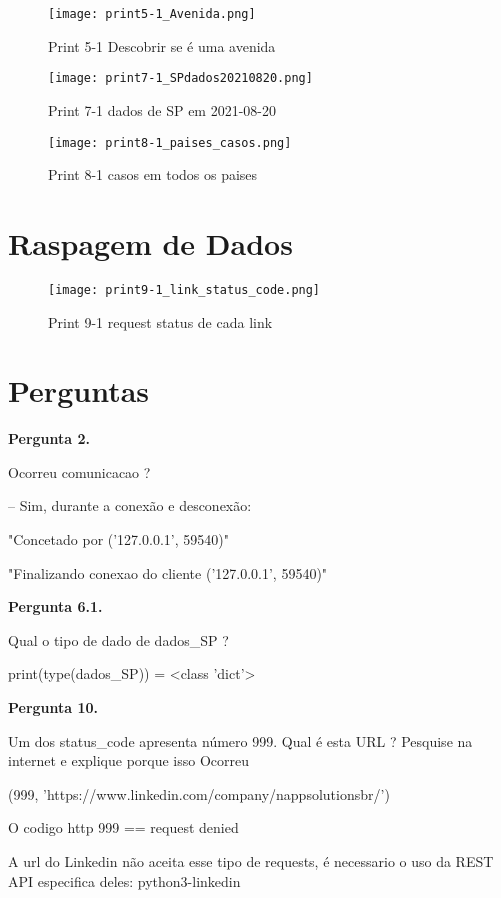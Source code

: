 \documentclass{article}
\begin{document}
\begin{figure}[ht]
    \centering
    \texttt{[image: print5-1\_Avenida.png]}
    \caption{Print 5-1 Descobrir se é uma avenida}
\end{figure}

\begin{figure}[ht]
    \centering
    \texttt{[image: print7-1\_SPdados20210820.png]}
    \caption{Print 7-1 dados de SP em 2021-08-20}
\end{figure}

\begin{figure}[ht]
    \centering
    \texttt{[image: print8-1\_paises\_casos.png]}
    \caption{Print 8-1 casos em todos os paises}
\end{figure}

\newpage
\section{Raspagem de Dados}

\begin{figure}[ht]
    \centering
    \texttt{[image: print9-1\_link\_status\_code.png]}
    \caption{Print 9-1 request status de cada link}
\end{figure}


\newpage
\section{Perguntas}

\noindent
\textbf{Pergunta 2.}\par
Ocorreu comunicacao ?\newline

-- Sim, durante a conexão e desconexão:

"Concetado por ('127.0.0.1', 59540)"

"Finalizando conexao do cliente ('127.0.0.1', 59540)"
\newline

\noindent
\textbf{Pergunta 6.1.}\par
Qual o tipo de dado de dados{\_}SP ?\newline

print(type(dados{\_}SP)) = <class 'dict'>
\newline

\noindent
\textbf{ Pergunta 10.}\par
Um dos status\_code apresenta número 999. Qual é esta URL ? Pesquise na internet e explique porque isso Ocorreu \newline

(999, 'https://www.linkedin.com/company/nappsolutionsbr/')\par

O codigo http 999 == request denied\par
A url do Linkedin não aceita esse tipo de requests, é necessario o uso da REST API especifica deles: python3-linkedin\par
\end{document}
